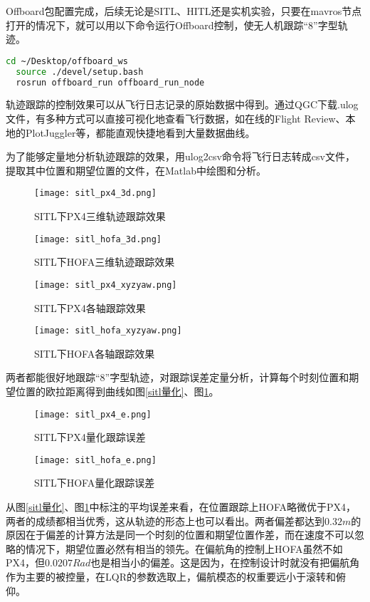 Offboard包配置完成，后续无论是SITL、HITL还是实机实验，只要在mavros节点打开的情况下，就可以用以下命令运行Offboard控制，使无人机跟踪“8”字型轨迹。

\begin{lstlisting}[language=Bash, basicstyle=\footnotesize, linewidth=\linewidth, breaklines=true]
  cd ~/Desktop/offboard_ws
  source ./devel/setup.bash
  rosrun offboard_run offboard_run_node
\end{lstlisting}

轨迹跟踪的控制效果可以从飞行日志记录的原始数据中得到。通过QGC下载.ulog文件，有多种方式可以直接可视化地查看飞行数据，如在线的Flight Review、本地的PlotJuggler等，都能直观快捷地看到大量数据曲线。

为了能够定量地分析轨迹跟踪的效果，用ulog2csv命令将飞行日志转成csv文件，提取其中位置和期望位置的文件，在Matlab中绘图和分析。

\begin{figure}[htb]
  \centering
  \begin{minipage}[b]{0.49\linewidth}
      \texttt{[image: sitl\_px4\_3d.png]}
      \caption{SITL下PX4三维轨迹跟踪效果}
  \end{minipage}
  \hfill %
  \begin{minipage}[b]{0.49\linewidth}
      \texttt{[image: sitl\_hofa\_3d.png]}
      \caption{SITL下HOFA三维轨迹跟踪效果}
  \end{minipage}


  \begin{minipage}[b]{0.49\linewidth}
      \texttt{[image: sitl\_px4\_xyzyaw.png]}
      \caption{SITL下PX4各轴跟踪效果}
  \end{minipage}
  \hfill
  \begin{minipage}[b]{0.49\linewidth}
      \texttt{[image: sitl\_hofa\_xyzyaw.png]}
      \caption{SITL下HOFA各轴跟踪效果}
  \end{minipage}
\end{figure}

两者都能很好地跟踪“8”字型轨迹，对跟踪误差定量分析，计算每个时刻位置和期望位置的欧拉距离得到曲线如图\ref{sitl量化}、图\ref{sitl量化hofa}。

\begin{figure}[htb]
  \centering
  \begin{minipage}[b]{0.49\linewidth}
    \texttt{[image: sitl\_px4\_e.png]}
    \caption{SITL下PX4量化跟踪误差}
    \label{sitl量化}
\end{minipage}
\hfill
\begin{minipage}[b]{0.49\linewidth}
    \texttt{[image: sitl\_hofa\_e.png]}
    \caption{SITL下HOFA量化跟踪误差}
    \label{sitl量化hofa}
\end{minipage}

\end{figure}

从图\ref{sitl量化}、图\ref{sitl量化hofa}中标注的平均误差来看，在位置跟踪上HOFA略微优于PX4，两者的成绩都相当优秀，这从轨迹的形态上也可以看出。两者偏差都达到$0.32m$的原因在于偏差的计算方法是同一个时刻的位置和期望位置作差，而在速度不可以忽略的情况下，期望位置必然有相当的领先。在偏航角的控制上HOFA虽然不如PX4，但$0.0207 Rad$也是相当小的偏差。这是因为，在控制设计时就没有把偏航角作为主要的被控量，在LQR的参数选取上，偏航模态的权重要远小于滚转和俯仰。